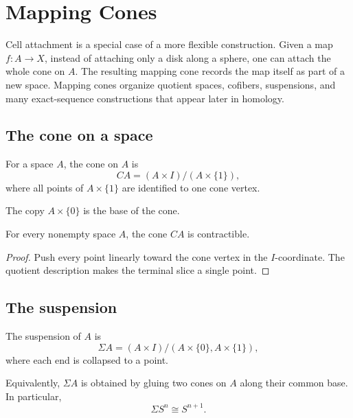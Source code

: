 ﻿\chapter{Mapping Cones}
\label{ch:viii07-mapping-cones}

Cell attachment is a special case of a more flexible construction.  Given a
map \(f:A\to X\), instead of attaching only a disk along a sphere, one can
attach the whole cone on \(A\).  The resulting mapping cone records the map
itself as part of a new space.  Mapping cones organize quotient spaces,
cofibers, suspensions, and many exact-sequence constructions that appear later
in homology.

\section{The cone on a space}

\begin{definition}[Cone]
\label{def:viii07-cone}
For a space \(A\), the cone on \(A\) is
\[
CA=(A\times I)/(A\times\{1\}),
\]
where all points of \(A\times\{1\}\) are identified to one cone vertex.
\end{definition}

The copy \(A\times\{0\}\) is the base of the cone.

\begin{proposition}
\label{prop:viii07-cone-contractible}
For every nonempty space \(A\), the cone \(CA\) is contractible.
\end{proposition}

\begin{proof}
Push every point linearly toward the cone vertex in the \(I\)-coordinate.
The quotient description makes the terminal slice a single point.
\end{proof}

\section{The suspension}

\begin{definition}[Suspension]
\label{def:viii07-suspension}
The suspension of \(A\) is
\[
\Sigma A=(A\times I)/(A\times\{0\},A\times\{1\}),
\]
where each end is collapsed to a point.
\end{definition}

Equivalently, \(\Sigma A\) is obtained by gluing two cones on \(A\) along their
common base.  In particular,
\[
\Sigma S^n\cong S^{n+1}.
\]

